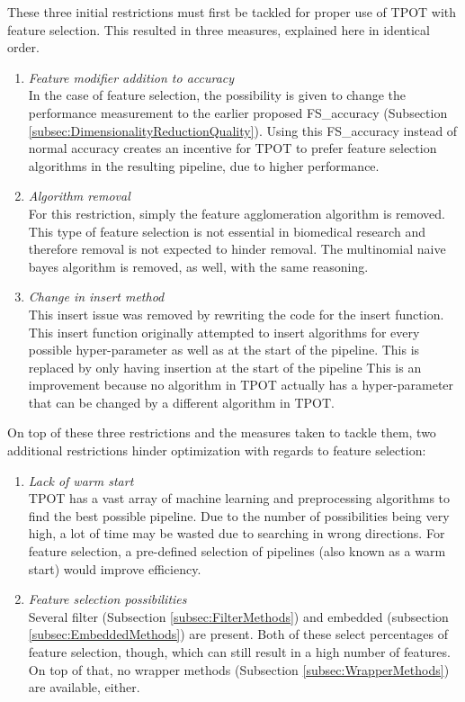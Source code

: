 \documentclass[10pt,a4paper]{article}
\begin{document}
	These three initial restrictions must first be tackled for proper use of TPOT with feature selection. This resulted in three measures, explained here in identical order.
	
	\begin{enumerate}
		\item \textit{Feature modifier addition to accuracy} \\
		In the case of feature selection, the possibility is given to change the performance measurement to the earlier proposed FS\_accuracy (Subsection \ref{subsec:DimensionalityReductionQuality}). Using this FS\_accuracy instead of normal accuracy creates an incentive for TPOT to prefer feature selection algorithms in the resulting pipeline, due to higher performance.
		\item \textit{Algorithm removal} \\
		For this restriction, simply the feature agglomeration algorithm is removed. This type of feature selection is not essential in biomedical research and therefore removal is not expected to hinder removal. The multinomial naive bayes algorithm is removed, as well, with the same reasoning.
		\item \textit{Change in insert method} \\
		This insert issue was removed by rewriting the code for the insert function. This insert function originally attempted to insert algorithms for every possible hyper-parameter as well as at the start of the pipeline. This is replaced by only having insertion at the start of the pipeline This is an improvement because no algorithm in TPOT actually has a hyper-parameter that can be changed by a different algorithm in TPOT.
	\end{enumerate}
	
	On top of these three restrictions and the measures taken to tackle them, two additional restrictions hinder optimization with regards to feature selection:
	
	\begin{enumerate}
				\item \textit{Lack of warm start} \\
		TPOT has a vast array of machine learning and preprocessing algorithms to find the best possible pipeline. Due to the number of possibilities being very high, a lot of time may be wasted due to searching in wrong directions. For feature selection, a pre-defined selection of pipelines (also known as a warm start) would improve efficiency.
		\item \textit{Feature selection possibilities} \\
		Several filter (Subsection \ref{subsec:FilterMethods}) and embedded (subsection \ref{subsec:EmbeddedMethods}) are present. Both of these select percentages of feature selection, though, which can still result in a high number of features. On top of that, no wrapper methods (Subsection \ref{subsec:WrapperMethods}) are available, either.
	\end{enumerate}
	
\end{document}
